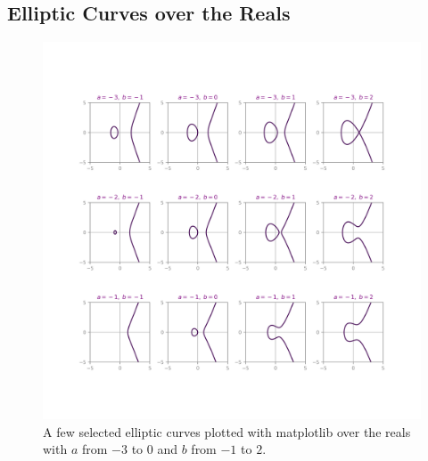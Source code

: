 \documentclass[11pt, a4paper]{report}
\begin{document}
\subsection{Elliptic Curves over the Reals}

\begin{figure}[h]
\begin{center}
\includegraphics[width=\linewidth]{elliptic_curves.png} 
\caption{A few selected elliptic curves plotted with matplotlib over the reals with $a$ from $-3$ to $0$ and $b$ from  $-1$ to $2$.}
\label{fig:realECs}
\end{center}
\end{figure}
\end{document}
